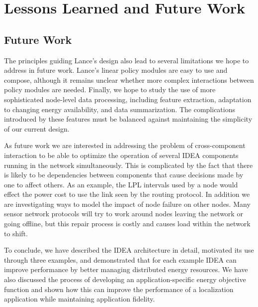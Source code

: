 \chapter{Lessons Learned and Future Work}
\label{chap-lessons}


\cite{rbs}

\section{Future Work}


The principles guiding Lance's design also lead to several limitations we
hope to address in future work.  Lance's linear policy modules are easy to
use and compose, although it remains unclear whether more complex
interactions between policy modules are needed. Finally, we hope to study the
use of more sophisticated node-level data processing, including feature
extraction, adaptation to changing energy availability, and data
summarization.  The complications introduced by these features must be
balanced against maintaining the simplicity of our current design.


As future work we are interested in addressing the problem of cross-component
interaction to be able to optimize the operation of several IDEA components
running in the network simultaneously. This is complicated by the fact that
there is likely to be dependencies between components that cause decisions
made by one to affect others. As an example, the LPL intervals used by a node
would effect the power cost to use the link seen by the routing protocol.  In
addition we are investigating ways to model the impact of node failure on
other nodes. Many sensor network protocols will try to work around nodes
leaving the network or going offline, but this repair process is costly and
causes load within the network to shift.

To conclude, we have described the IDEA architecture in detail, motivated its
use through three examples, and demonstrated that for each example IDEA can
improve performance by better managing distributed energy resources. We have
also discussed the process of developing an application-specific energy
objective function and shown how this can improve the performance of a
localization application while maintaining application fidelity.
\vfill\eject
